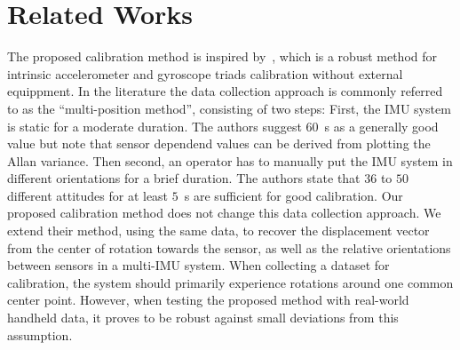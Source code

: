\documentclass[journal]{IEEEtran}
\begin{document}
\section{Related Works}

The proposed calibration method is inspired by~\cite{imutk2014}, which is a robust method for intrinsic accelerometer and gyroscope triads calibration without external equippment. 
In the literature the data collection approach is commonly referred to as the ``multi-position method'',  consisting of two steps: 
First, the IMU system is static for a moderate duration.
The authors suggest $60$~s as a generally good value but note that sensor dependend values can be derived from plotting the Allan variance.
Then second, an operator has to manually put the IMU system in different orientations for a brief duration.
The authors state that $36$ to $50$ different attitudes for at least $5$~s are sufficient for good calibration. 
Our proposed calibration method does not change this data collection approach.
We extend their method, using the same data, to recover the displacement vector from the center of rotation towards the sensor, as well as the relative orientations between sensors in a multi-IMU system.
When collecting a dataset for calibration, the system should primarily experience rotations around one common center point.
However, when testing the proposed method with real-world handheld data, it proves to be robust against small deviations from this assumption.
\end{document}
